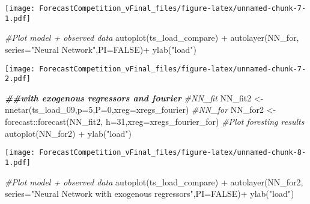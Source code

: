 \documentclass[
]{article}
\newenvironment{Shaded}{\begin{snugshade}}{\end{snugshade}}
\newcommand{\AttributeTok}[1]{\textcolor[rgb]{0.77,0.63,0.00}{#1}}
\newcommand{\CommentTok}[1]{\textcolor[rgb]{0.56,0.35,0.01}{\textit{#1}}}
\newcommand{\ConstantTok}[1]{\textcolor[rgb]{0.00,0.00,0.00}{#1}}
\newcommand{\DecValTok}[1]{\textcolor[rgb]{0.00,0.00,0.81}{#1}}
\newcommand{\DocumentationTok}[1]{\textcolor[rgb]{0.56,0.35,0.01}{\textbf{\textit{#1}}}}
\newcommand{\FunctionTok}[1]{\textcolor[rgb]{0.00,0.00,0.00}{#1}}
\newcommand{\NormalTok}[1]{#1}
\newcommand{\OtherTok}[1]{\textcolor[rgb]{0.56,0.35,0.01}{#1}}
\newcommand{\SpecialCharTok}[1]{\textcolor[rgb]{0.00,0.00,0.00}{#1}}
\newcommand{\StringTok}[1]{\textcolor[rgb]{0.31,0.60,0.02}{#1}}
\begin{document}
\texttt{[image: ForecastCompetition\_vFinal\_files/figure-latex/unnamed-chunk-7-1.pdf]}

\begin{Shaded}
\begin{Highlighting}[]
\CommentTok{\#Plot model + observed data}
\FunctionTok{autoplot}\NormalTok{(ts\_load\_compare) }\SpecialCharTok{+}
  \FunctionTok{autolayer}\NormalTok{(NN\_for, }\AttributeTok{series=}\StringTok{"Neural Network"}\NormalTok{,}\AttributeTok{PI=}\ConstantTok{FALSE}\NormalTok{)}\SpecialCharTok{+}
  \FunctionTok{ylab}\NormalTok{(}\StringTok{"load"}\NormalTok{) }
\end{Highlighting}
\end{Shaded}

\texttt{[image: ForecastCompetition\_vFinal\_files/figure-latex/unnamed-chunk-7-2.pdf]}

\begin{Shaded}
\begin{Highlighting}[]
\DocumentationTok{\#\#with exogenous regressors and fourier}
\CommentTok{\#NN\_fit}
\NormalTok{NN\_fit2 }\OtherTok{\textless{}{-}} \FunctionTok{nnetar}\NormalTok{(ts\_load\_09,}\AttributeTok{p=}\DecValTok{5}\NormalTok{,}\AttributeTok{P=}\DecValTok{0}\NormalTok{,}\AttributeTok{xreg=}\NormalTok{xregs\_fourier)}
\CommentTok{\#NN\_for }
\NormalTok{NN\_for2 }\OtherTok{\textless{}{-}}\NormalTok{ forecast}\SpecialCharTok{::}\FunctionTok{forecast}\NormalTok{(NN\_fit2, }\AttributeTok{h=}\DecValTok{31}\NormalTok{,}\AttributeTok{xreg=}\NormalTok{xregs\_fourier\_for)}
\CommentTok{\#Plot foresting results}
\FunctionTok{autoplot}\NormalTok{(NN\_for2) }\SpecialCharTok{+}
  \FunctionTok{ylab}\NormalTok{(}\StringTok{"load"}\NormalTok{) }
\end{Highlighting}
\end{Shaded}

\texttt{[image: ForecastCompetition\_vFinal\_files/figure-latex/unnamed-chunk-8-1.pdf]}

\begin{Shaded}
\begin{Highlighting}[]
\CommentTok{\#Plot model + observed data}
\FunctionTok{autoplot}\NormalTok{(ts\_load\_compare) }\SpecialCharTok{+}
  \FunctionTok{autolayer}\NormalTok{(NN\_for2, }\AttributeTok{series=}\StringTok{"Neural Network with exogenous regressors"}\NormalTok{,}\AttributeTok{PI=}\ConstantTok{FALSE}\NormalTok{)}\SpecialCharTok{+}
  \FunctionTok{ylab}\NormalTok{(}\StringTok{"load"}\NormalTok{) }
\end{Highlighting}
\end{Shaded}
\end{document}
